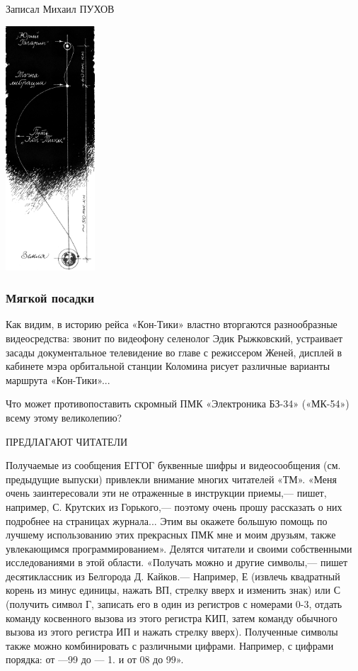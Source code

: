 \documentclass[11pt,a4paper,oneside]{article}
\begin{document}
Записал Михаил ПУХОВ

\includegraphics[width=0.25\textwidth]{ug2}

\subsubsection{Мягкой посадки}

Как видим, в историю рейса «Кон-Тики» властно вторгаются разнообразные видеосредства: звонит по видеофону селенолог Эдик Рыжковский, устраивает засады документальное телевидение во главе с режиссером Женей, дисплей в кабинете мэра орбитальной станции Коломина рисует различные варианты маршрута «Кон-Тики»...

Что может противопоставить скромный ПМК «Электроника БЗ-34» («МК-54») всему этому великолепию?

ПРЕДЛАГАЮТ ЧИТАТЕЛИ

Получаемые из сообщения ЕГГОГ буквенные шифры и видеосообщения (см. предыдущие выпуски) привлекли внимание многих читателей «ТМ». «Меня очень заинтересовали эти не отраженные в инструкции приемы,— пишет, например, С. Крутских из Горького,— поэтому очень прошу рассказать о них подробнее на страницах журнала... Этим вы окажете большую помощь по лучшему использованию этих прекрасных ПМК мне и моим друзьям, также увлекающимся программированием». Делятся читатели и своими собственными исследованиями в этой области. «Получать можно и другие символы,— пишет десятиклассник из Белгорода Д. Кайков.— Например, Е (извлечь квадратный корень из минус единицы, нажать ВП, стрелку вверх и изменить знак) или С (получить символ Г, записать его в один из регистров с номерами 0-3, отдать команду косвенного вызова из этого регистра КИП, затем команду обычного вызова из этого регистра ИП и нажать стрелку вверх). Полученные символы также можно комбинировать с различными цифрами. Например, с цифрами порядка: от —99 до — 1. и от 08 до 99».
\end{document}
